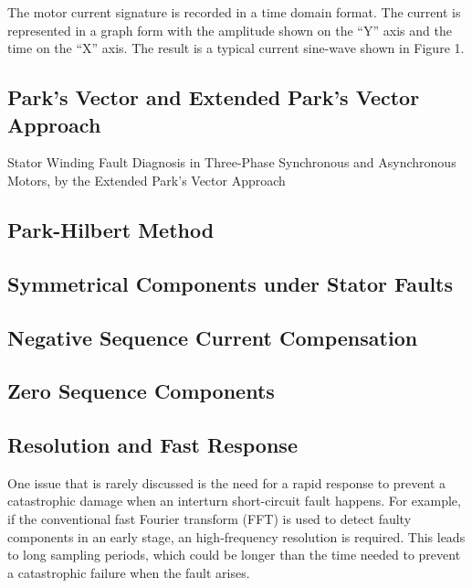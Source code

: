 The motor current signature is recorded in a time domain format. The current is represented in a graph form with the amplitude shown on the “Y” axis and the time on the “X” axis. The result is a typical current sine-wave shown in Figure 1.


\subsection{Park's Vector and Extended Park's Vector Approach} %
\label{subsec:epva}

Stator Winding Fault Diagnosis in Three-Phase Synchronous and Asynchronous Motors, by the Extended Park’s Vector Approach


\subsection{Park-Hilbert Method} %
\label{subsec:park_hilbert_method}

\subsection{Symmetrical Components under Stator Faults} %
\label{subsec:symmetrical_components}

\subsection{Negative Sequence Current Compensation} %
\label{subsec:negative_sequence_current_compensation}

\subsection{Zero Sequence Components} %
\label{subsec:zero_sequence_components}

\subsection{Resolution and Fast Response} %
\label{subsec:resolution_fast_response}

One issue that is rarely discussed is the need for a rapid response to prevent a catastrophic damage when an interturn short-circuit fault happens. For example, if the conventional fast Fourier transform (FFT) is used to detect faulty components in an early stage, an high-frequency resolution is required. This leads to long sampling periods, which could be longer than the time needed to prevent a catastrophic failure when the fault arises. 

